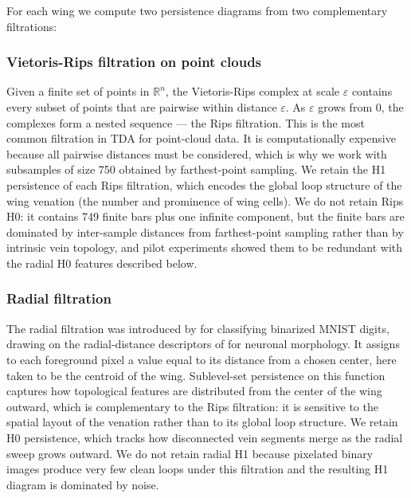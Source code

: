 \documentclass[
  a4paper,
  DIV=11,
  numbers=noendperiod]{scrartcl}
\begin{document}
For each wing we compute two persistence diagrams from two complementary
filtrations:

\subsubsection{Vietoris-Rips filtration on point
clouds}\label{vietoris-rips-filtration-on-point-clouds}

Given a finite set of points in \(\mathbb{R}^n\), the Vietoris-Rips
complex at scale \(\varepsilon\) contains every subset of points that
are pairwise within distance \(\varepsilon\). As \(\varepsilon\) grows
from \(0\), the complexes form a nested sequence --- the Rips
filtration. This is the most common filtration in TDA for point-cloud
data. It is computationally expensive because all pairwise distances
must be considered, which is why we work with subsamples of size 750
obtained by farthest-point sampling. We retain the H1 persistence of
each Rips filtration, which encodes the global loop structure of the
wing venation (the number and prominence of wing cells). We do not
retain Rips H0: it contains 749 finite bars plus one infinite component,
but the finite bars are dominated by inter-sample distances from
farthest-point sampling rather than by intrinsic vein topology, and
pilot experiments showed them to be redundant with the radial H0
features described below.

\subsubsection{Radial filtration}\label{radial-filtration}

The radial filtration was introduced by \textcite{garin2019topological}
for classifying binarized MNIST digits, drawing on the radial-distance
descriptors of \textcite{kanari2018topological} for neuronal morphology.
It assigns to each foreground pixel a value equal to its distance from a
chosen center, here taken to be the centroid of the wing. Sublevel-set
persistence on this function captures how topological features are
distributed from the center of the wing outward, which is complementary
to the Rips filtration: it is sensitive to the spatial layout of the
venation rather than to its global loop structure. We retain H0
persistence, which tracks how disconnected vein segments merge as the
radial sweep grows outward. We do not retain radial H1 because pixelated
binary images produce very few clean loops under this filtration and the
resulting H1 diagram is dominated by noise.
\end{document}
